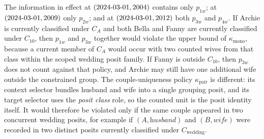 \documentclass[a4paper,fleqn]{cas-sc}
\begin{document}
The information in effect at \((\textrm{2024\text{-}03\text{-}01}, \textrm{2004})\) contains only \(p_{1w}\); at \((\textrm{2024\text{-}03\text{-}01}, \textrm{2009})\) only \(p_{2w}\); and at \((\textrm{2024\text{-}03\text{-}01}, \textrm{2012})\) both \(p_{3w}\) and \(p_{4w}\). If Archie is currently classified under \(C_{A}\) and both Bella and Fanny are currently classified under \(C_{10}\), then \(p_{1w}\) and \(p_{3w}\) together would violate the upper bound of \(\kappa_{\mathrm{mono}}\), because a current member of \(C_{A}\) would occur with two counted wives from that class within the scoped wedding posit family. If Fanny is outside \(C_{10}\), then \(p_{3w}\) does not count against that policy, and Archie may still have one additional wife outside the constrained group. The couple-uniqueness policy \(\kappa_{\mathrm{pair}}\) is different: its context selector bundles husband and wife into a single grouping posit, and its target selector uses the \textit{posit class} role, so the counted unit is the posit identity itself. It would therefore be violated only if the same couple appeared in two concurrent wedding posits, for example if \((A,\textit{husband})\) and \((B,\textit{wife})\) were recorded in two distinct posits currently classified under \(C_{\mathrm{wedding}}\).
\end{document}
